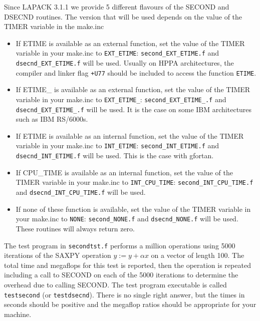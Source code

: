 \documentclass[11pt]{report}
\begin{document}
Since LAPACK 3.1.1 we provide 5 different flavours of the SECOND and DSECND routines.
The version that will be used depends on the value of the TIMER variable in the make.inc

\begin{itemize}
\item If ETIME is available as an external function, set the value of the TIMER variable in your
make.inc to \texttt{EXT\_ETIME}: \texttt{second\_EXT\_ETIME.f} and \texttt{dsecnd\_EXT\_ETIME.f} will be used.
Usually on HPPA architectures,
the compiler and linker flag \texttt{+U77} should be included to access
the function \texttt{ETIME}.

\item If ETIME\_ is available as an external function, set the value of the TIMER variable in your make.inc
to \texttt{EXT\_ETIME\_}: \texttt{second\_EXT\_ETIME\_.f} and \texttt{dsecnd\_EXT\_ETIME\_.f} will be used.
It is the case on some IBM architectures such as IBM RS/6000s.

\item If ETIME is available as an internal function, set the value of the TIMER variable in your make.inc
to \texttt{INT\_ETIME}: \texttt{second\_INT\_ETIME.f}  and \texttt{dsecnd\_INT\_ETIME.f} will be used.
This is the case with gfortan.

\item If CPU\_TIME is available as an internal function, set the value of the TIMER variable in your make.inc
to \texttt{INT\_CPU\_TIME}: \texttt{second\_INT\_CPU\_TIME.f} and \texttt{dsecnd\_INT\_CPU\_TIME.f} will be used.

\item If none of these function is available, set the value of the TIMER variable in your make.inc
to \texttt{NONE}: \texttt{second\_NONE.f} and \texttt{dsecnd\_NONE.f} will be used.
These routines will always return zero.
\end{itemize}

The test program in \texttt{secondtst.f}
performs a million operations using 5000 iterations of
the SAXPY operation $y := y + \alpha x$ on a vector of length 100.
The total time and megaflops for this test is reported, then
the operation is repeated including a call to SECOND on each of
the 5000 iterations to determine the overhead due to calling SECOND.
The test program executable is called \texttt{testsecond} (or \texttt{testdsecnd}).
There is no single right answer, but the times
in seconds should be positive and the megaflop ratios should be
appropriate for your machine.
\end{document}
